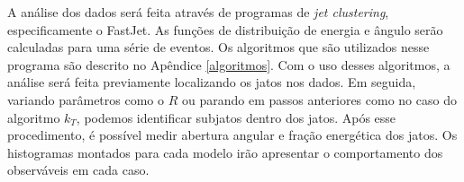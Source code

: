 A análise dos dados será feita através de programas de \emph{jet clustering}, especificamente
o FastJet\cite{noauthor_fastjet_nodate}. As funções de distribuição de energia e ângulo serão
calculadas para uma série de eventos. Os algoritmos que são utilizados nesse programa são descrito
no Apêndice \ref{algoritmos}. Com o uso desses algoritmos, a análise será feita previamente localizando
os jatos nos dados. Em seguida, variando parâmetros como o $R$ ou parando em passos anteriores como no
caso do algoritmo $k_T$, podemos identificar subjatos dentro dos jatos. Após esse procedimento, é possível
medir abertura angular e fração energética dos jatos. Os histogramas montados para cada modelo
irão apresentar o comportamento dos observáveis em cada caso.